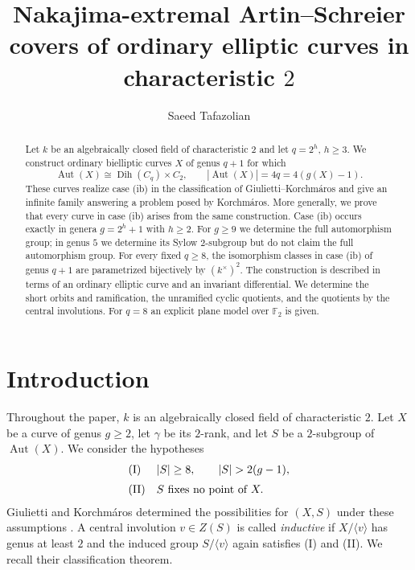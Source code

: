 \documentclass[11pt]{article}
\title{Nakajima-extremal Artin--Schreier covers of ordinary elliptic curves in characteristic $2$}
\author{Saeed Tafazolian}
\date{}
\theoremstyle{remark}
\newcommand{\Aut}{\operatorname{Aut}}
\newcommand{\Dih}{\operatorname{Dih}}
\newcommand{\F}{\mathbb F}
\begin{document}
\maketitle

\begin{abstract}
Let $k$ be an algebraically closed field of characteristic $2$ and let
$q=2^h$, $h\ge3$.  We construct ordinary bielliptic curves $X$ of genus
$q+1$ for which
\[
        \Aut(X)\cong \Dih(C_q)\times C_2,
        \qquad |\Aut(X)|=4q=4(g(X)-1).
\]
These curves realize case \textup{(ib)} in the classification of
Giulietti--Korchm\'aros and give an infinite family answering a problem
posed by Korchm\'aros.  More generally, we prove that every curve in case
\textup{(ib)} arises from the same construction.  Case \textup{(ib)}
occurs exactly in genera $g=2^h+1$ with $h\ge2$.  For $g\ge9$ we determine
the full automorphism group; in genus $5$ we determine its Sylow
$2$-subgroup but do not claim the full automorphism group.  For every fixed
$q\ge8$, the isomorphism classes in case
\textup{(ib)} of genus $q+1$ are parametrized bijectively by
$(k^\times)^2$.  The construction is described in terms of an ordinary
elliptic curve and an invariant differential.  We determine
the short orbits and ramification, the unramified cyclic quotients, and
the quotients by the central involutions.  For $q=8$ an explicit plane
model over $\F_2$ is given.
\end{abstract}

\section{Introduction}

Throughout the paper, $k$ is an algebraically closed field of
characteristic $2$.  Let $X$ be a curve of genus $g\ge2$, let $\gamma$
be its $2$-rank, and let $S$ be a $2$-subgroup of $\Aut(X)$.  We consider
the hypotheses
\[
\begin{array}{ll}
\textup{(I)}  & |S|\ge8,\qquad |S|>2(g-1),\\[2mm]
\textup{(II)} & S\text{ fixes no point of }X.
\end{array}
\]
Giulietti and Korchm\'aros determined the possibilities for $(X,S)$
under these assumptions \cite{GK2015}.  A central involution $v\in Z(S)$
is called \emph{inductive} if $X/\langle v\rangle$ has genus at least $2$
and the induced group $S/\langle v\rangle$ again satisfies
\textup{(I)} and \textup{(II)}.  We recall their classification theorem.
\end{document}
